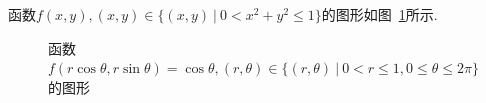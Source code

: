 \documentclass[12pt,UTF8]{ctexart}
\newcommand\Set[2]{\{#1\ \vert\ #2 \}}
\begin{document}
\begin{enumerate}
函数$f(x,y),(x,y)\in\Set{(x,y)}{0<x^2+y^2\leqslant1}$的图形如图~\ref{costheta}所示.
\begin{figure}[H]
\begin{center}
\end{center}
\caption{函数$f(r\cos\theta,r\sin\theta)=\cos\theta,(r,\theta)\in\Set{(r,\theta)}{0<r\leqslant1,0\leqslant\theta\leqslant2\pi}$的图形}
\label{costheta}
\end{figure}
\end{enumerate}
\end{document}

